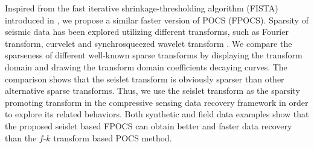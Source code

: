 
Inspired from the fast iterative shrinkage-thresholding algorithm (FISTA) introduced in \cite{beck2009}, we propose a similar faster version of POCS (FPOCS).  Sparsity of seismic data has been explored utilizing different transforms, such as Fourier transform, curvelet \cite[]{candes20061} and synchrosqueezed wavelet transform \cite[]{yangkang2014sswt}. We compare the sparseness of different well-known sparse transforms by displaying the transform domain and drawing the transform domain coefficients decaying curves. The comparison shows that the seislet transform is obviously sparser than other alternative sparse transforms. Thus, we use the seislet transform \cite[]{seislet,yangkang20142} as the sparsity promoting transform in the compressive sensing data recovery framework in order to explore its related behaviors. Both synthetic and field data examples show that the proposed seislet based FPOCS can obtain better and faster data recovery than the $f$-$k$ transform based POCS method. 

